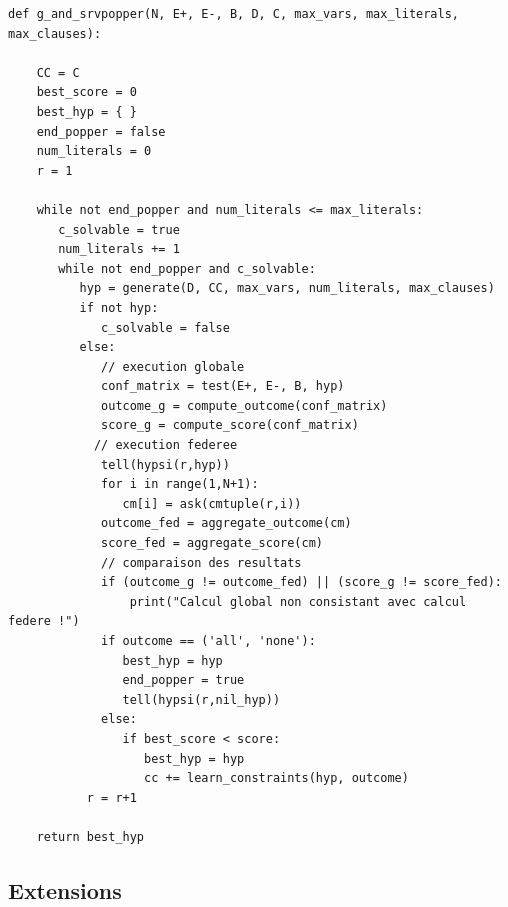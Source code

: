 \begin{algorithm}[t]
  \caption{Popper + Srvpopper client pour tests de Yasmine}
  \label{alg:srvpopper}
  \small
  \begin{lstlisting}
def g_and_srvpopper(N, E+, E-, B, D, C, max_vars, max_literals, max_clauses):

    CC = C
    best_score = 0
    best_hyp = { }
    end_popper = false
    num_literals = 0
    r = 1

    while not end_popper and num_literals <= max_literals:
       c_solvable = true
       num_literals += 1
       while not end_popper and c_solvable:
          hyp = generate(D, CC, max_vars, num_literals, max_clauses)
          if not hyp:
             c_solvable = false
          else:
             // execution globale
             conf_matrix = test(E+, E-, B, hyp)
             outcome_g = compute_outcome(conf_matrix)
             score_g = compute_score(conf_matrix)
            // execution federee
             tell(hypsi(r,hyp))
             for i in range(1,N+1):
                cm[i] = ask(cmtuple(r,i))
             outcome_fed = aggregate_outcome(cm)
             score_fed = aggregate_score(cm)
             // comparaison des resultats
             if (outcome_g != outcome_fed) || (score_g != score_fed):
                 print("Calcul global non consistant avec calcul federe !")
             if outcome == ('all', 'none'):
                best_hyp = hyp
                end_popper = true
                tell(hypsi(r,nil_hyp))                
             else:
                if best_score < score:
                   best_hyp = hyp
                   cc += learn_constraints(hyp, outcome)
           r = r+1
                   
    return best_hyp
  \end{lstlisting}
\end{algorithm}


\subsection{Extensions}
